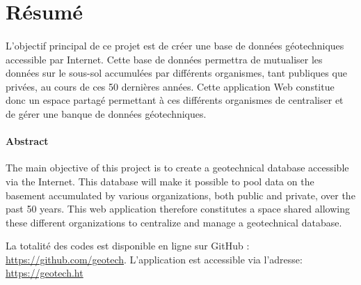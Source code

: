 \section{Résumé}
\paragraph{}
L'objectif principal de ce projet est de créer une base de données géotechni\-ques
 accessible par Internet. Cette base de données permettra de mutualiser les données 
 sur le sous-sol accumulées par différents organismes, tant publiques que privées, 
 au cours de ces 50 dernières années. Cette application Web constitue donc un espace 
 partagé permettant à ces différents organismes de centraliser et de gérer une banque 
 de données géotechniques.


\paragraph{Abstract}
The main objective of this project is to create a geotechnical 
database accessible via the Internet. This database will make it possible to pool data
 on the basement accumulated by various organizations, both public and private,
 over the past 50 years. This web application therefore constitutes a space
 shared allowing these different organizations to centralize and manage a
 geotechnical database.
\bigskip
\bigskip
\par
 {\small 
 La totalité des codes est disponible en ligne sur GitHub : \url{https://github.com/geotech}.
L’application est accessible via l’adresse: \url{https://geotech.ht}

 }
